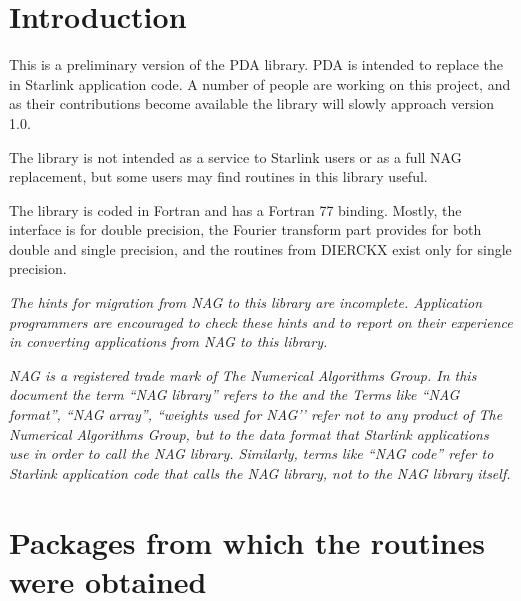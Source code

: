 \documentclass[11pt,twoside,nolof]{starlink}
\begin{document}
\scfrontmatter

\section{Introduction}

   This is a preliminary version of the PDA library. PDA
   is intended to replace the
   in Starlink application code. A number of people are working on this
   project, and as their contributions become available the
   library will slowly approach version 1.0.

   The library is not intended as a service to Starlink users or as a
   full NAG replacement, but some users may find routines in this library
   useful.

   The library is coded in Fortran and has a Fortran 77 binding. Mostly,
   the interface is for double precision, the Fourier transform part
   provides for both double and single precision, and the routines from
   DIERCKX exist only for single precision.

\emph{The hints for migration from NAG to this library are incomplete.
   Application programmers are encouraged to check these hints and to
   report on their experience in converting applications from NAG to
   this library.}

\emph{
   NAG is a registered trade mark of The Numerical Algorithms Group. In
   this document the term ``\emph{NAG library}'' refers to the
   and the
   Terms like ``\emph{NAG format}'', ``\emph{NAG array}'', ``\emph{weights used for NAG'}'
   refer not to any product of The Numerical Algorithms Group, but to
   the data format that Starlink applications use in order to call the
   NAG library. Similarly, terms like ``\emph{NAG code}'' refer to Starlink
   application code that calls the NAG library, not to the NAG library
   itself.
}


\section{Packages from which the routines were obtained}
\end{document}

